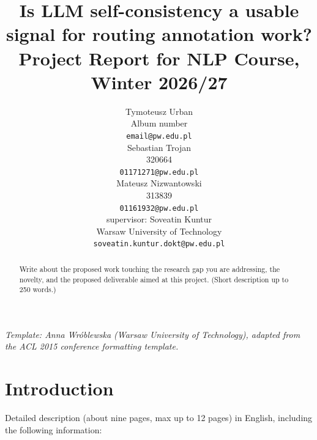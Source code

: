 \documentclass[11pt]{article}
\title{Is LLM self-consistency a usable signal for routing annotation work?\\Project Report for NLP Course, Winter 2026/27}
\author{Tymoteusz Urban \\
  Album number \\
  {\tt email@pw.edu.pl} \\\And
  Sebastian Trojan \\
  320664 \\
  {\tt 01171271@pw.edu.pl} \\ \And
  Mateusz Nizwantowski \\
  313839 \\
  {\tt 01161932@pw.edu.pl} \\
  \AND
  supervisor: Soveatin Kuntur\\
  Warsaw University of Technology \\
  {\tt soveatin.kuntur.dokt@pw.edu.pl}
  }
\date{}
\begin{document}
\maketitle

{\small\em Template: Anna Wr\'oblewska (Warsaw University of Technology), adapted from the ACL 2015 conference formatting template.}
\vspace{4pt}


\begin{abstract}
  Write about the proposed work touching the research gap you are addressing, the novelty, and the proposed deliverable aimed at this project.  
  (Short description up to 250 words.)
\end{abstract}

\section{Introduction}
Detailed description (about nine pages, max up to 12 pages) in English, including the following information:
\end{document}
